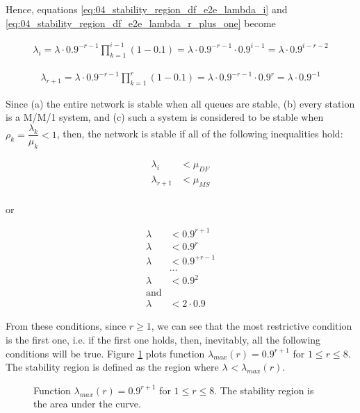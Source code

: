 Hence, equations \ref{eq:04_stability_region_df_e2e_lambda_i} and
\ref{eq:04_stability_region_df_e2e_lambda_r_plus_one} become

\begin{align*}
  \lambda_i = \lambda \cdot 0.9^{-r-1} \prod\limits_{k=1}^{i-1} (1 - 0.1) = \lambda \cdot 0.9^{-r-1} \cdot 0.9^{i-1} = \lambda \cdot 0.9^{i-r-2}
\end{align*}

\begin{align*}
  \lambda_{r+1} = \lambda \cdot 0.9^{-r-1} \prod\limits_{k=1}^{r} (1 - 0.1) = \lambda \cdot 0.9^{-r-1} \cdot 0.9^r = \lambda \cdot 0.9^{-1}
\end{align*}

Since (a) the entire network is stable when all queues are stable, (b) every
station is a M/M/1 system, and (c) such a system is considered to be stable
when $\rho_k = \dfrac{\lambda_k}{\mu_k} < 1$, then, the network is stable if all
of the following inequalities hold:

\begin{align*}
  \lambda_i &< \mu_{DF} \\
  \lambda_{r+1} &< \mu_{MS} \\
\end{align*}

or

\begin{align*}
  \lambda &< 0.9^{r+1} \\
  \lambda &< 0.9^{r} \\
  \lambda &< 0.9^{+r-1} \\
  & \dots \\
  \lambda &< 0.9^2 \\
  \text{and}\\
  \lambda &< 2 \cdot 0.9
\end{align*}

From these conditions, since $r \geq 1$, we can see that the most
restrictive condition is the first one, i.e. if the first one holds, then,
inevitably, all the following conditions will be true. Figure
\ref{fig:04_stability_region_df_e2e} plots function
$\lambda_{max}(r) = 0.9^{r+1}$ for $1 \leq r \leq 8$. The stability
region is defined as the region where $\lambda_{} < \lambda_{max}(r)$.

\begin{figure}[H]\centering
  
  \caption{Function $\lambda_{max}(r) = 0.9^{r+1}$ for $1 \leq r \leq 8$.
    The stability region is the area under the curve.}
  \label{fig:04_stability_region_df_e2e}
\end{figure}

